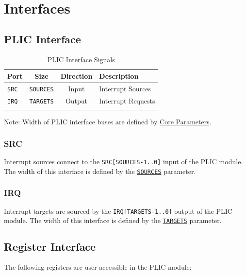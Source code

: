 \section{Interfaces}



\subsection{PLIC Interface} 

 

\begin{longtable}[c]{@{\extracolsep{\fill}}lccl@{\extracolsep{\fill}}}	
	\toprule
	\textbf{Port} & \textbf{Size} & \textbf{Direction} & \textbf{Description}\\
	\midrule 
	\endhead
	\texttt{SRC} & \texttt{SOURCES} & Input & Interrupt Sources\\
	\texttt{IRQ} & \texttt{TARGETS} & Output & Interrupt Requests \\
	\bottomrule 	
	\caption{PLIC Interface Signals} 
	\label{tab:PLICIF2}
\end{longtable}

Note: Width of PLIC interface buses are defined by
\protect\hyperlink{core-parameters}{Core Parameters}.

\subsubsection{SRC}

Interrupt sources connect to the \texttt{SRC{[}SOURCES-1..0{]}} input of
the PLIC module. The width of this interface is defined by the
\protect\hyperlink{SOURCES}{\texttt{SOURCES}} parameter.

\subsubsection{IRQ}

Interrupt targets are sourced by the \texttt{IRQ{[}TARGETS-1..0{]}}
output of the PLIC module. The width of this interface is defined by the
\protect\hyperlink{TARGETS}{\texttt{TARGETS}} parameter.

\subsection{Register Interface}

The following registers are user accessible in the PLIC module:

